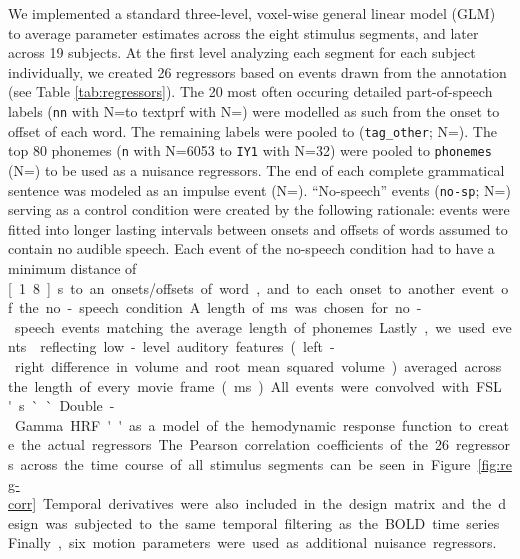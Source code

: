 \documentclass[10pt,a4paper,onecolumn]{article}
\begin{document}
We implemented a standard three-level, voxel-wise general linear model (GLM) to average parameter estimates across the eight stimulus segments, and later across 19 subjects.
At the first level analyzing each segment for each subject individually, we created 26 regressors based on events drawn from the annotation (see Table \ref{tab:regressors}).
The 20 most often occuring detailed part-of-speech labels (\texttt{nn} with N=\rNnAll\space to text{prf} with N=\rPrfAll) were modelled as such from the onset to offset of each word.
The remaining labels were pooled to (\texttt{tag\_other}; N=\rTagotherAll).
The top 80 phonemes (\texttt{n} with N=6053 to \texttt{IY1} with N=32) were pooled to \texttt{phonemes} (N=\rPhonesAll) to be used as a nuisance regressors.
The end of each complete grammatical sentence was modeled as an impulse event (N=\rSentenceAll).
``No-speech'' events (\texttt{no-sp}; N=\rNospAll) serving as a control condition were created by the following rationale:
events were fitted into longer lasting intervals between onsets and offsets of words assumed to contain no audible speech.
Each event of the no-speech condition had to have a minimum distance of \unit[1.8]{s} to an onsets/offsets of word, and to each onset to another event of the no-speech condition.
A length of \unit[70]{ms} was chosen for no-speech events matching the average length of phonemes.
Lastly, we used events reflecting low-level auditory features (left-right difference in volume and root mean squared volume) averaged across the length of every movie frame (\unit[40]{ms}).
All events were convolved with FSL's ``Double-Gamma HRF'' as a model of the hemodynamic response function to create the actual regressors.
The Pearson correlation coefficients of the 26 regressors across the time course of all stimulus segments can be seen in Figure \ref{fig:reg-corr}.
Temporal derivatives were also included in the design matrix and the design was subjected to the same temporal filtering as the BOLD time series.
Finally, six motion parameters were used as additional nuisance regressors.
\end{document}
